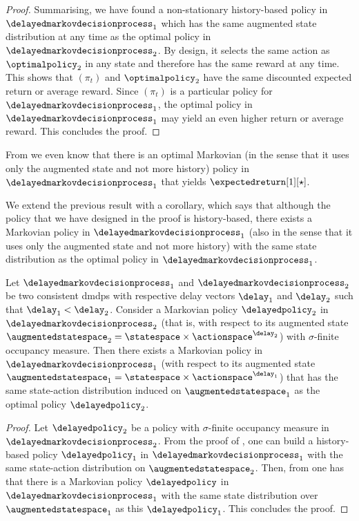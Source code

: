 \begin{proof}
    Summarising, we have found a non-stationary history-based policy in  $\delayedmarkovdecisionprocess_{1}$ which has the same augmented state distribution at any time as the optimal policy in $\delayedmarkovdecisionprocess_{2}$. 
    By design, it selects the same action as $\optimalpolicy_2$ in any state and therefore has the same reward at any time.
    This shows that $(\pi_t)$ and $\optimalpolicy_2$ have the same discounted expected return or average reward.
    Since $(\pi_t)$ is a particular policy for $\delayedmarkovdecisionprocess_{1}$, the optimal policy in $\delayedmarkovdecisionprocess_{1}$ may yield an even higher return or average reward. This concludes the proof.
\end{proof}

\begin{remark}
    From \cite[Theorem~6.2.10 and Theorem~8.1.2]{puterman1994markov} we even know that there is an optimal Markovian (in the sense that it uses only the augmented state and not more history) policy in $\delayedmarkovdecisionprocess_{1}$  that yields $\expectedreturn[1][\star]$.
\end{remark}

We extend the previous result with a corollary, which says that although the policy that we have designed in the proof is history-based, there exists a Markovian policy in $\delayedmarkovdecisionprocess_{1}$ (also in the sense that it uses only the augmented state and not more history) with the same state distribution as the optimal policy in $\delayedmarkovdecisionprocess_{1}$.

\begin{prop}
\label{corol:markov_optimal_delayed_equiv}
    Let $\delayedmarkovdecisionprocess_{1}$ and $\delayedmarkovdecisionprocess_{2}$ be two consistent \glspl{dmdp} with respective delay vectors $\delay_1$ and $\delay_2$ such that $\delay_1<\delay_2$. 
    Consider a Markovian policy $\delayedpolicy_2$ in $\delayedmarkovdecisionprocess_{2}$ (that is, with respect to its augmented state $\augmentedstatespace_2=\statespace\times\actionspace^{\delay_2}$) with $\sigma$-finite occupancy measure.
    Then there exists a Markovian policy in $\delayedmarkovdecisionprocess_{1}$ (with respect to its augmented state $\augmentedstatespace_1=\statespace\times\actionspace^{\delay_1}$) that has the same state-action distribution induced on $\augmentedstatespace_1$ as the optimal policy $\delayedpolicy_2$.
\end{prop}
\begin{proof}
    Let $\delayedpolicy_2$ be a policy with $\sigma$-finite occupancy measure in $\delayedmarkovdecisionprocess_{2}$.
    From the proof of , one can build a history-based policy $\delayedpolicy_1$ in $\delayedmarkovdecisionprocess_{1}$ with the same state-action distribution on $\augmentedstatespace_2$.
    Then, from \cite[Theorem~3]{laroche2022non} one has that there is a Markovian policy $\delayedpolicy$ in $\delayedmarkovdecisionprocess_{1}$ with the same state distribution over $\augmentedstatespace_1$ as this $\delayedpolicy_1$. 
    This concludes the proof.
\end{proof}

